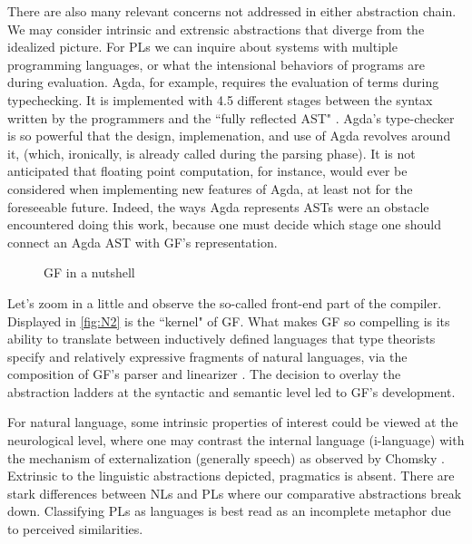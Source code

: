 There are also many relevant concerns not addressed in either abstraction chain.
We may consider intrinsic and extrensic abstractions that diverge from the
idealized picture. For PLs we can inquire about systems with multiple
programming languages, or what the intensional behaviors of programs are during
evaluation. Agda, for example, requires the evaluation of terms during
typechecking. It is implemented with 4.5 different stages between the syntax
written by the programmers and the ``fully reflected AST" \cite{andreasEmail}.
Agda's type-checker is so powerful that the design, implemenation, and use of
Agda revolves around it, (which, ironically, is already called during the
parsing phase). It is not anticipated that floating point computation, for
instance, would ever be considered when implementing new features of Agda, at
least not for the foreseeable future. Indeed, the ways Agda represents ASTs were
an obstacle encountered doing this work, because one must decide which stage one
should connect an Agda AST with GF's representation.

\begin{figure}
\centering
{}
\caption{GF in a nutshell} \label{fig:N2}
\end{figure}

Let's zoom in a little and observe the so-called front-end part of the compiler.
Displayed in \autoref{fig:N2} is the ``kernel" of GF. What makes GF so
compelling is its ability to translate between inductively defined languages
that type theorists specify and relatively expressive fragments of natural
languages, via the composition of GF's parser and linearizer . The decision to
overlay the abstraction ladders at the syntactic and semantic level led to GF's
development.

For natural language, some intrinsic properties of interest could be viewed at
the neurological level, where one may contrast the internal language
(i-language) with the mechanism of externalization (generally speech) as
observed by Chomsky \cite{Chomsky1995}. Extrinsic to the linguistic abstractions
depicted, pragmatics is absent. There are stark differences between NLs and PLs
where our comparative abstractions break down. Classifying PLs as languages is
best read as an incomplete metaphor due to perceived similarities.


